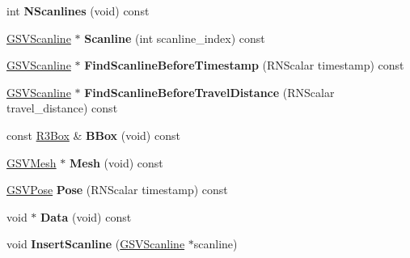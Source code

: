 \begin{DoxyCompactItemize}
\item 
int {\bfseries N\+Scanlines} (void) const \hypertarget{class_g_s_v_scan_a58eee30968b3d422bc6cf860b22d41d3}{}\label{class_g_s_v_scan_a58eee30968b3d422bc6cf860b22d41d3}

\item 
\hyperlink{class_g_s_v_scanline}{G\+S\+V\+Scanline} $\ast$ {\bfseries Scanline} (int scanline\+\_\+index) const \hypertarget{class_g_s_v_scan_a6c0990abc474d4bfcb7ea77076b24426}{}\label{class_g_s_v_scan_a6c0990abc474d4bfcb7ea77076b24426}

\item 
\hyperlink{class_g_s_v_scanline}{G\+S\+V\+Scanline} $\ast$ {\bfseries Find\+Scanline\+Before\+Timestamp} (R\+N\+Scalar timestamp) const \hypertarget{class_g_s_v_scan_a7bc79f99e48e44641afeca7208339839}{}\label{class_g_s_v_scan_a7bc79f99e48e44641afeca7208339839}

\item 
\hyperlink{class_g_s_v_scanline}{G\+S\+V\+Scanline} $\ast$ {\bfseries Find\+Scanline\+Before\+Travel\+Distance} (R\+N\+Scalar travel\+\_\+distance) const \hypertarget{class_g_s_v_scan_a646377d432494e96f46a72636f4fda05}{}\label{class_g_s_v_scan_a646377d432494e96f46a72636f4fda05}

\item 
const \hyperlink{class_r3_box}{R3\+Box} \& {\bfseries B\+Box} (void) const \hypertarget{class_g_s_v_scan_a6c0763aafef1558b35e360e0cf997fd0}{}\label{class_g_s_v_scan_a6c0763aafef1558b35e360e0cf997fd0}

\item 
\hyperlink{class_g_s_v_mesh}{G\+S\+V\+Mesh} $\ast$ {\bfseries Mesh} (void) const \hypertarget{class_g_s_v_scan_ad2a0fd171dbd6091021b2938d8d4afb7}{}\label{class_g_s_v_scan_ad2a0fd171dbd6091021b2938d8d4afb7}

\item 
\hyperlink{class_g_s_v_pose}{G\+S\+V\+Pose} {\bfseries Pose} (R\+N\+Scalar timestamp) const \hypertarget{class_g_s_v_scan_aa045acf110d249d0ee62ba08d29237af}{}\label{class_g_s_v_scan_aa045acf110d249d0ee62ba08d29237af}

\item 
void $\ast$ {\bfseries Data} (void) const \hypertarget{class_g_s_v_scan_a0d78f0b4a419d4d3625dafed849920e0}{}\label{class_g_s_v_scan_a0d78f0b4a419d4d3625dafed849920e0}

\item 
void {\bfseries Insert\+Scanline} (\hyperlink{class_g_s_v_scanline}{G\+S\+V\+Scanline} $\ast$scanline)\hypertarget{class_g_s_v_scan_ab270165ff48b6fc518bb9119be5e13bf}{}\label{class_g_s_v_scan_ab270165ff48b6fc518bb9119be5e13bf}


\end{DoxyCompactItemize}
